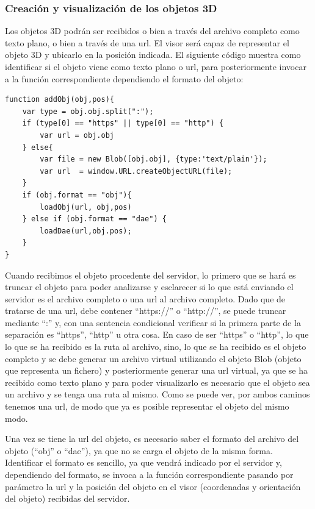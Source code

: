 \subsubsection{Creación y visualización de los objetos 3D}
Los objetos 3D podrán ser recibidos o bien a través del archivo completo como texto plano, o bien a través de una url. El visor será capaz de representar el objeto 3D y ubicarlo en la posición indicada. El siguiente código muestra como identificar si el objeto viene como texto plano o url, para posteriormente invocar a la función correspondiente dependiendo el formato del objeto:
\begin{lstlisting}[frame=single]
function addObj(obj,pos){
	var type = obj.obj.split(":");
	if (type[0] == "https" || type[0] == "http") {
		var url = obj.obj
	} else{
		var file = new Blob([obj.obj], {type:'text/plain'});
		var url  = window.URL.createObjectURL(file);
	}
	if (obj.format == "obj"){
		loadObj(url, obj,pos)
	} else if (obj.format == "dae") {
		loadDae(url,obj.pos);
	}
}
\end{lstlisting}
Cuando recibimos el objeto procedente del servidor, lo primero que se hará es truncar el objeto para poder analizarse y esclarecer si lo que está enviando el servidor es el archivo completo o una url al archivo completo. Dado que de tratarse de una url, debe contener ``https://'' o ``http://'', se puede truncar mediante ``:'' y, con una sentencia condicional verificar si la primera parte de la separación es ``https'', ``http'' u otra cosa. En caso de ser ``https'' o ``http'', lo que lo que se ha recibido es la ruta al archivo, sino, lo que se ha recibido es el objeto completo y se debe generar un archivo virtual utilizando el objeto Blob (objeto que representa un fichero) y posteriormente generar una url virtual, ya que se ha recibido como texto plano y para poder visualizarlo es necesario que el objeto sea un archivo y se tenga una ruta al mismo. Como se puede ver, por ambos caminos tenemos una url, de modo que ya es posible representar el objeto del mismo modo.

Una vez se tiene la url del objeto, es necesario saber el formato del archivo del objeto (``obj'' o ``dae''), ya que no se carga el objeto de la misma forma. Identificar el formato es sencillo, ya que vendrá indicado por el servidor y, dependiendo del formato, se invoca a la función correspondiente pasando por parámetro la url y la posición del objeto en el visor (coordenadas y orientación del objeto) recibidas del servidor.


